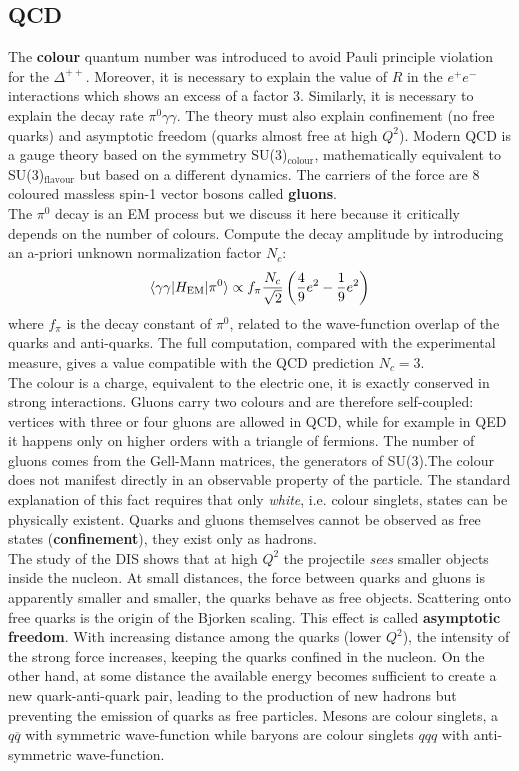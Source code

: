 \documentclass[10.75pt,a4paper,openright,bottom=2cm]{article}
\begin{document}
\subsection{QCD}
The \textbf{colour} quantum number was introduced to avoid Pauli principle violation for the $\Delta^{++}$. Moreover, it is necessary to explain the value of $R$ in the $e^+e^-$ interactions which shows an excess of a factor 3. Similarly, it is necessary to explain the decay rate $\pi^0\gamma\gamma$. The theory must also explain confinement (no free quarks) and asymptotic freedom (quarks almost free at high $Q^2$). Modern QCD is a gauge theory based on the symmetry SU(3)$_{\text{colour}}$, mathematically equivalent to SU(3)$_{\text{flavour}}$ but based on a different dynamics. The carriers of the force are 8 coloured massless spin-1 vector bosons called \textbf{gluons}.\\
The $\pi^0$ decay is an EM process but we discuss it here because it critically depends on the number of colours. Compute the decay amplitude by introducing an a-priori unknown normalization factor $N_c$:
\[
\braket{\gamma\gamma|H_{\text{EM}}|\pi^0}\propto f_\pi\frac{N_c}{\sqrt{2}}\left(\frac{4}{9}e^2-\frac{1}{9}e^2\right)
\]
where $f_\pi$ is the decay constant of $\pi^0$, related to the wave-function overlap of the quarks and anti-quarks. The full computation, compared with the experimental measure, gives a value compatible with the QCD prediction $N_c=3$.\\
The colour is a charge, equivalent to the electric one, it is exactly conserved in strong interactions. Gluons carry two colours and are therefore self-coupled: vertices with three or four gluons are allowed in QCD, while for example in QED it happens only on higher orders with a triangle of fermions. The number of gluons comes from the Gell-Mann matrices, the generators of SU(3).The colour does not manifest directly in an observable property of the particle. The standard explanation of this fact requires that only \textit{white}, i.e. colour singlets, states can be physically existent. Quarks and gluons themselves cannot be observed as free states (\textbf{confinement}), they exist only as hadrons.\\
The study of the DIS shows that at high $Q^2$ the projectile \textit{sees} smaller objects inside the nucleon. At small distances, the force between quarks and gluons is apparently smaller and smaller, the quarks behave as free objects. Scattering onto free quarks is the origin of the Bjorken scaling. This effect is called \textbf{asymptotic freedom}. With increasing distance among the quarks (lower $Q^2$), the intensity of the strong force increases, keeping the quarks confined in the nucleon. On the other hand, at some distance the available energy becomes sufficient to create a new quark-anti-quark pair, leading to the production of new hadrons but preventing the emission of quarks as free particles. Mesons are colour singlets, a $q\overline{q}$ with symmetric wave-function while baryons are colour singlets $qqq$ with anti-symmetric wave-function.\\
\end{document}
